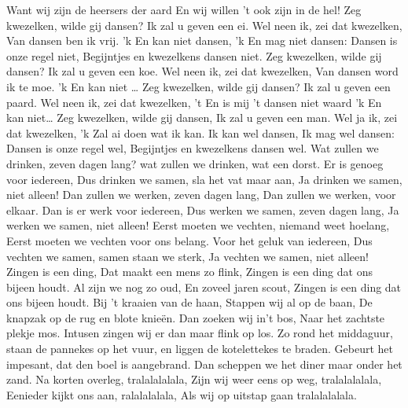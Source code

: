 \documentclass{article}
\begin{document}
\begin{songs}{}
Want wij zijn de heersers der aard 
En wij willen ’t ook zijn in de hel!
\endverse
\endsong
{}
\beginverse*
Zeg kwezelken, wilde gij dansen?
Ik zal u geven een ei.
Wel neen ik, zei dat kwezelken,
Van dansen ben ik vrij.
'k En kan niet dansen,
'k En mag niet dansen:
Dansen is onze regel niet,
Begijntjes en kwezelkens dansen niet.
\endverse
\beginverse*
Zeg kwezelken, wilde gij dansen?
Ik zal u geven een koe.
Wel neen ik, zei dat kwezelken,
Van dansen word ik te moe.
'k En kan niet …
\endverse
\beginverse*
Zeg kwezelken, wilde gij
dansen?
Ik zal u geven een paard.
Wel neen ik, zei dat kwezelken,
't En is mij 't dansen niet waard
'k En kan niet…
\endverse
\beginverse*
Zeg kwezelken, wilde gij dansen,
Ik zal u geven een man.
Wel ja ik, zei dat kwezelken,
'k Zal ai doen wat ik kan.
Ik kan wel dansen,
Ik mag wel dansen:
Dansen is onze regel wel,
Begijntjes en kwezelkens dansen wel.
\endverse
\endsong
{}
\beginverse*
Wat zullen we drinken, zeven dagen lang?
wat zullen we drinken, wat een dorst. 
\endverse
\beginverse*
Er is genoeg voor iedereen,
Dus drinken we samen, sla het vat maar aan,
Ja drinken we samen, niet alleen! 
\endverse
\beginverse*
Dan zullen we werken, zeven dagen lang,
Dan zullen we werken, voor elkaar. 
\endverse
\beginverse*
Dan is er werk voor iedereen, 
Dus werken we samen, zeven dagen lang, 
Ja werken we samen, niet alleen! 
\endverse
\beginverse*
Eerst moeten we vechten, niemand weet hoelang,
Eerst moeten we vechten voor ons belang. 
\endverse
\beginverse*
Voor het geluk van iedereen,
Dus vechten we samen, samen staan we sterk,
Ja vechten we samen, niet alleen! 
\endverse
\endsong
{}
\beginchorus
Zingen is een ding,
Dat maakt een mens zo flink,
Zingen is een ding dat ons bijeen houdt.
Al zijn we nog zo oud,
En zoveel jaren scout,
Zingen is een ding dat ons bijeen houdt. 
\endchorus
\beginverse*
Bij 't kraaien van de haan,
Stappen wij al op de baan,
De knapzak op de rug en blote knieën.
Dan zoeken wij in’t bos,
Naar het zachtste plekje mos. 
Intusen zingen wij er dan maar flink op los. 
\endverse
\beginverse*
Zo rond het middaguur,
staan de pannekes op het vuur,
en liggen de kotelettekes te braden.
Gebeurt het impesant,
dat den boel is aangebrand.
Dan scheppen we het diner maar onder het zand.
\endverse
\endsong
{}
\beginverse*
Na korten overleg, tralalalalala,
Zijn wij weer eens op weg, tralalalalala,
Eenieder kijkt ons aan, ralalalalala,
Als wij op uitstap gaan tralalalalala.
\endverse

\end{songs}
\end{document}
